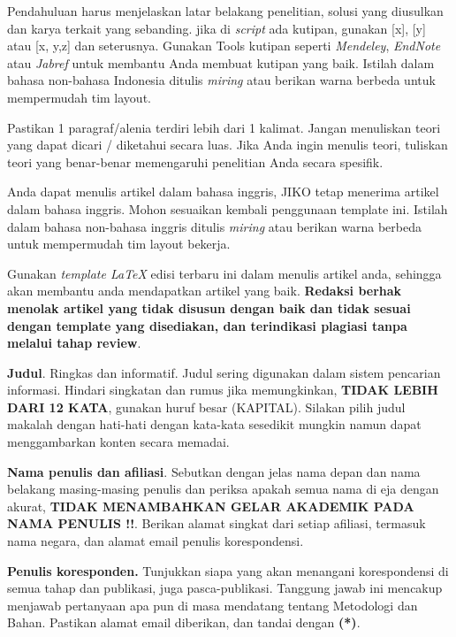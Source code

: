 \documentclass[
 manuscript=article,  %
  layout=publish, 
  year=2024, 
  month= Februari, %
  volume=8,
  number=1 
]{JIKO}
\begin{document}
Pendahuluan harus menjelaskan
latar belakang penelitian, solusi yang diusulkan dan karya terkait yang sebanding. jika di \textit{script} ada
kutipan, gunakan [x], [y] atau [x, y,z] dan seterusnya. Gunakan Tools kutipan seperti \textit{Mendeley}, \textit{EndNote} atau \textit{Jabref} untuk
membantu Anda membuat kutipan yang baik. Istilah dalam bahasa non-bahasa Indonesia ditulis \textit{miring} atau {\color{blue}berikan warna berbeda} untuk mempermudah tim layout.

Pastikan 1 paragraf/alenia terdiri lebih dari 1 kalimat. Jangan menuliskan teori yang dapat dicari / diketahui secara luas. Jika Anda ingin menulis teori, tuliskan teori yang benar-benar memengaruhi penelitian Anda secara spesifik.

Anda dapat menulis artikel dalam bahasa inggris, JIKO tetap menerima artikel dalam bahasa inggris. Mohon sesuaikan kembali penggunaan template ini. Istilah dalam bahasa non-bahasa inggris ditulis \textit{miring} atau {\color{blue}berikan warna berbeda} untuk mempermudah tim layout bekerja.

Gunakan \textit{template \LaTeX} edisi terbaru ini dalam menulis artikel anda, sehingga akan membantu anda mendapatkan artikel yang baik. \textbf{Redaksi berhak menolak artikel yang tidak disusun dengan baik dan tidak sesuai dengan template yang disediakan, dan terindikasi plagiasi tanpa melalui tahap review}.

\textbf{Judul}. Ringkas dan informatif. Judul sering digunakan dalam sistem pencarian informasi. Hindari singkatan dan rumus jika memungkinkan, \textbf{TIDAK LEBIH DARI 12 KATA}, gunakan huruf besar (KAPITAL)\cite{Wu}. Silakan pilih judul makalah dengan hati-hati dengan kata-kata sesedikit 
mungkin namun dapat menggambarkan konten secara memadai. 

\textbf{Nama penulis dan afiliasi}. Sebutkan dengan jelas nama depan dan nama belakang
masing-masing penulis dan periksa apakah semua nama di eja dengan akurat, \textbf{TIDAK   MENAMBAHKAN GELAR AKADEMIK PADA NAMA PENULIS !!}.
Berikan alamat singkat dari setiap afiliasi, termasuk nama negara, dan
alamat email penulis korespondensi.

\textbf{Penulis koresponden.} Tunjukkan siapa yang akan menangani korespondensi di semua tahap
dan publikasi, juga pasca-publikasi. Tanggung jawab ini mencakup menjawab pertanyaan apa pun di masa mendatang tentang
Metodologi dan Bahan. Pastikan alamat email diberikan, dan tandai dengan \textbf{(*)}.


\end{document}
